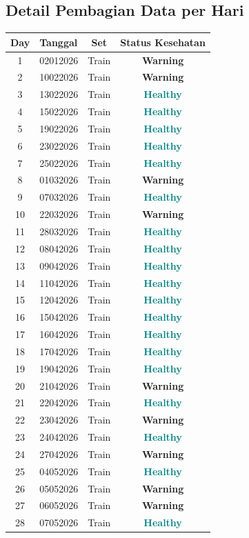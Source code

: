 \documentclass[11pt,a4paper]{article}
\newcommand{\healthy}{\textcolor{teal}{\textbf{Healthy}}}
\newcommand{\warning}{\textcolor{orange!80!black}{\textbf{Warning}}}
\begin{document}
\subsection{Detail Pembagian Data per Hari}
\begin{longtable}{clcc}
    \toprule
    \textbf{Day} & \textbf{Tanggal} & \textbf{Set} & \textbf{Status Kesehatan} \\
    \midrule
    \endhead
    1  & 02012026 & Train & \warning \\
    2  & 10022026 & Train & \warning \\
    3  & 13022026 & Train & \healthy \\
    4  & 15022026 & Train & \healthy \\
    5  & 19022026 & Train & \healthy \\
    6  & 23022026 & Train & \healthy \\
    7  & 25022026 & Train & \healthy \\
    8  & 01032026 & Train & \warning \\
    9  & 07032026 & Train & \healthy \\
    10 & 22032026 & Train & \warning \\
    11 & 28032026 & Train & \healthy \\
    12 & 08042026 & Train & \healthy \\
    13 & 09042026 & Train & \healthy \\
    14 & 11042026 & Train & \healthy \\
    15 & 12042026 & Train & \healthy \\
    16 & 15042026 & Train & \healthy \\
    17 & 16042026 & Train & \healthy \\
    18 & 17042026 & Train & \healthy \\
    19 & 19042026 & Train & \healthy \\
    20 & 21042026 & Train & \warning \\
    21 & 22042026 & Train & \healthy \\
    22 & 23042026 & Train & \warning \\
    23 & 24042026 & Train & \healthy \\
    24 & 27042026 & Train & \warning \\
    25 & 04052026 & Train & \healthy \\
    26 & 05052026 & Train & \warning \\
    27 & 06052026 & Train & \warning \\
    28 & 07052026 & Train & \healthy \\

\end{longtable}
\end{document}
